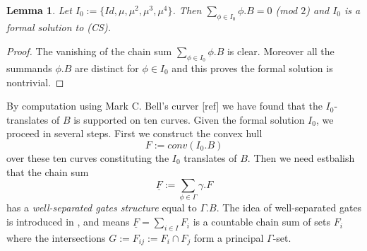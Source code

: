 \documentclass[12pt]{amsart}
\newtheorem{lem}[thm]{Lemma}
\theoremstyle{definition}
\theoremstyle{remark}
\newcommand{\uF}{\underline{F}}
\newcommand{\sC}{\mathscr{C}}
\begin{document}
\begin{lem}
Let $I_0:=\{Id, \mu, \mu^2, \mu^3, \mu^4\}$. Then $\sum_{\phi \in I_0} \phi.B=0$ (mod $2$) and $I_0$ is a formal solution to (CS). 
\end{lem}
\begin{proof}
The vanishing of the chain sum $\sum_{\phi \in I_0} \phi.B$ is clear. Moreover all the summands $\phi.B$ are distinct for $\phi \in I_0$ and this proves the formal solution is nontrivial.
\end{proof}

By computation using Mark C. Bell's curver [ref] we have found that the $I_0$-translates of $B$ is supported on ten curves. Given the formal solution $I_0$, we proceed in several steps. First we construct  the convex hull $$F:=conv( I_0.B )$$ over these ten curves constituting the $I_0$ translates of $B$. Then we need estbalish that the chain sum $$\underline{F}:=\sum_{\phi \in \Gamma} \gamma.F$$ has a \emph{well-separated gates structure} equal to $\Gamma.B$. The idea of well-separated gates is introduced in \cite[pp.13, \S 5.1]{martel}, and means $\uF=\sum_{i\in I} F_i$ is a countable chain sum of sets $F_i$ where the intersections $G:=F_{ij}:=F_i\cap F_j$ form a principal $\Gamma$-set.






\section{}











 


\end{document}
